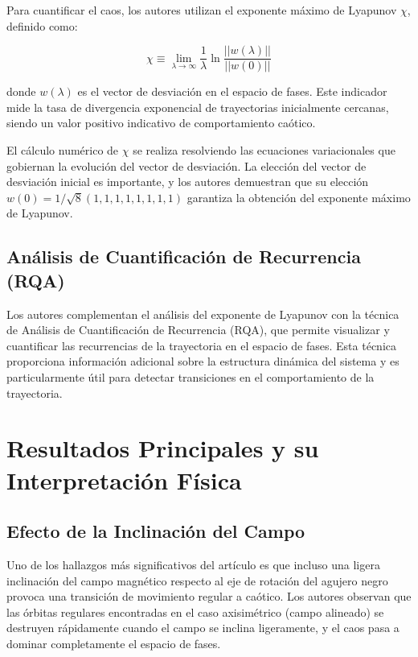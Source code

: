 \documentclass[a4paper,12pt]{article}
\begin{document}
Para cuantificar el caos, los autores utilizan el exponente máximo de Lyapunov $\chi$, definido como:

\begin{equation}
\chi\equiv\lim_{\lambda\to\infty}\frac{1}{\lambda}\ln\frac{||w(\lambda)||}{||w(0)||}
\end{equation}

donde $w(\lambda)$ es el vector de desviación en el espacio de fases. Este indicador mide la tasa de divergencia exponencial de trayectorias inicialmente cercanas, siendo un valor positivo indicativo de comportamiento caótico.

El cálculo numérico de $\chi$ se realiza resolviendo las ecuaciones variacionales que gobiernan la evolución del vector de desviación. La elección del vector de desviación inicial es importante, y los autores demuestran que su elección $w(0)=1/\sqrt{8}(1,1,1,1,1,1,1,1)$ garantiza la obtención del exponente máximo de Lyapunov.

\subsection{Análisis de Cuantificación de Recurrencia (RQA)}

Los autores complementan el análisis del exponente de Lyapunov con la técnica de Análisis de Cuantificación de Recurrencia (RQA), que permite visualizar y cuantificar las recurrencias de la trayectoria en el espacio de fases. Esta técnica proporciona información adicional sobre la estructura dinámica del sistema y es particularmente útil para detectar transiciones en el comportamiento de la trayectoria.

\section{Resultados Principales y su Interpretación Física}

\subsection{Efecto de la Inclinación del Campo}

Uno de los hallazgos más significativos del artículo es que incluso una ligera inclinación del campo magnético respecto al eje de rotación del agujero negro provoca una transición de movimiento regular a caótico. Los autores observan que las órbitas regulares encontradas en el caso axisimétrico (campo alineado) se destruyen rápidamente cuando el campo se inclina ligeramente, y el caos pasa a dominar completamente el espacio de fases.
\end{document}
